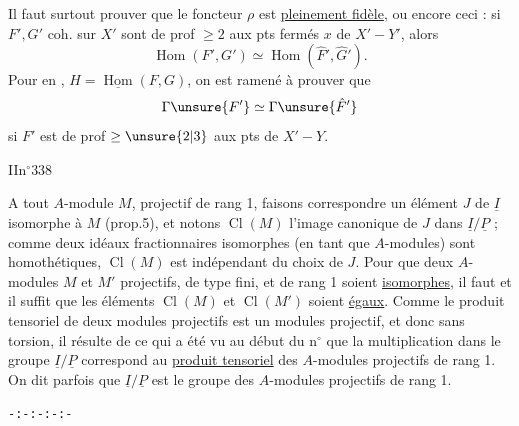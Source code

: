 
Il faut surtout prouver que le foncteur
$\rho$ est \uline{pleinement fidèle}, ou encore ceci : si
$F',G'$  coh. sur $X'$ sont de prof $\ge2$ aux
pts 
fermés $x$ de $X'-Y'$,  alors
\[
\operatorname{Hom}(F',G')\simeq\operatorname{Hom}(\hat F',\hat G').
\]
Pour en , 
$H=\underline{\operatorname{Hom}}(F,G)$,
on est ramené à prouver que
\[
\Gamma\unsure{F'}\simeq\Gamma\unsure{\hat F'}
\]
si $F'$ est de prof $\ge\unsure{2|3}$ aux pts
 de $X'-Y$.


II\hfill{}\hfill n$^\circ$338

A tout $A$-module $M$, projectif de rang 1, faisons correspondre un élément
$J$ de $\underline I$ isomorphe à $M$ (prop.5), et notons $\operatorname{Cl}(M)$ l'image canonique de $J$ dans
$\underline I/\underline P$ ; comme deux idéaux fractionnaires isomorphes (en tant que $A$-modules)
sont homothétiques, $\operatorname{Cl}(M)$ est indépendant du choix de $J$. Pour que deux
$A$-modules $M$ et $M'$ projectifs, de type fini, et de rang 1 soient \uline{isomorphes},
il faut et il suffit que les éléments $\operatorname{Cl}(M)$ et $\operatorname{Cl}(M')$ soient \uline{égaux}. Comme
le produit tensoriel de deux modules projectifs est un modules projectif, et
donc sans torsion, il résulte de ce qui a été vu au début du n$^\circ$ que la multiplication
dans le groupe $\underline I/\underline P$ correspond au \uline{produit tensoriel} des $A$-modules
projectifs de rang 1. On dit parfois que $\underline I/\underline P$ est le groupe des $A$-modules
projectifs de rang 1.

\begin{center}\texttt{-:-:-:-:-}\end{center}


